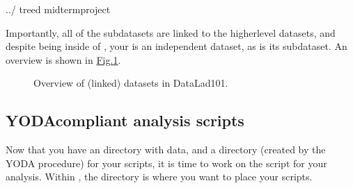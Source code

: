 \begin{sphinxVerbatim}[commandchars=\\\{\}]
../
tree\PYGZhy{}d
midterm\PYGZus{}project

\end{sphinxVerbatim}

\sphinxAtStartPar
Importantly, all of the subdatasets are linked to the higher\sphinxhyphen{}level datasets,
and despite being inside of , your  is an independent
dataset, as is its  subdataset. An overview is shown in \hyperref[\detokenize{basics/101-130-yodaproject:fig-linkeddl101}]{Fig.\@ \ref{\detokenize{basics/101-130-yodaproject:fig-linkeddl101}}}.

\begin{figure}[tbp]
\centering
\capstart

\noindent{}
\caption{Overview of (linked) datasets in DataLad\sphinxhyphen{}101.}\label{\detokenize{basics/101-130-yodaproject:id8}}\label{\detokenize{basics/101-130-yodaproject:fig-linkeddl101}}\end{figure}


\subsection{YODA\sphinxhyphen{}compliant analysis scripts}
\label{\detokenize{basics/101-130-yodaproject:yoda-compliant-analysis-scripts}}
\sphinxAtStartPar
Now that you have an  directory with data, and a  directory
(created by the YODA procedure) for your scripts, it is time to work on the script
for your analysis. Within , the  directory is where
you want to place your scripts.

